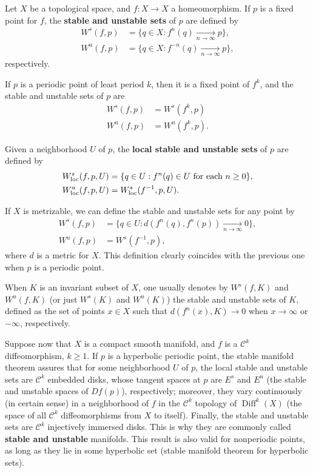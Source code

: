 \documentclass[12pt]{article}
\newcommand{\Diff}{\operatorname{Diff}}
\newcommand{\Cdiff}{\mathcal{C}}
\renewcommand{\emph}{\textbf}
\begin{document}

 Let $X$ be a topological space, and $f\colon X\rightarrow X$ a
homeomorphism. If $p$ is a fixed point for $f$, the \emph{stable and
unstable sets} of $p$ are defined by 
\begin{align*}
W^s(f,p)&=\{q\in X: f^n(q)\xrightarrow[n\rightarrow\infty]{} p\},\\ 
W^u(f,p)&=\{q\in X: f^{-n}(q)\xrightarrow[n\rightarrow\infty]{} p\}, 
\end{align*}
respectively.

If $p$ is a periodic point of least period $k$, then it is a fixed point of $f^k$, and the stable and unstable sets of $p$ are 
\begin{align*}
W^s(f,p)&= W^s(f^k,p)\\
W^u(f,p)&=W^u(f^k,p).
\end{align*}

Given a neighborhood $U$ of $p$, the \emph{local stable and unstable sets} of $p$ are defined by
\begin{align*}
W^s_{\text{loc}}(f,p,U)&= \{q\in U: f^n(q)\in U \textnormal{ for each }
n\geq 0\},\\ 
W^u_{\text{loc}}(f,p,U)&= W^s_{\text{loc}}(f^{-1},p,U).
\end{align*}

If $X$ is metrizable, we can define the stable and unstable sets for any point by
\begin{align*}
W^s(f,p) &= \{q\in U: d(f^n(q),f^n(p))\xrightarrow[n\rightarrow\infty]{} 0\},\\
W^u(f,p) &= W^s(f^{-1},p),
\end{align*} 
where $d$ is a metric for $X$. This definition clearly
coincides with the previous one when $p$ is a periodic point.

When $K$ is an invariant subset of $X$, one usually denotes by $W^s(f,K)$ and $W^u(f,K)$ (or just $W^s(K)$ and $W^u(K)$) the stable and unstable sets of $K$, defined as the set of points $x\in X$ such that $d(f^n(x),K)\to 0$ when $x\to \infty$ or $-\infty$, respectively.

Suppose now that $X$ is a compact smooth manifold, and $f$ is a $\Cdiff^k$
diffeomorphism, $k\geq 1$. If $p$ is a hyperbolic periodic point, the stable manifold theorem assures that for some neighborhood $U$ of $p$, the local stable and unstable sets are $\Cdiff^k$ embedded disks, whose tangent spaces at $p$ are $E^s$ and $E^u$ (the stable and unstable spaces of $Df(p)$), respectively; moreover, they vary continuously (in certain sense) in a neighborhood of $f$ in the $\Cdiff^k$ topology of $\Diff^k(X)$ (the space of all $\Cdiff^k$ diffeomorphisms from $X$ to itself). Finally, the stable and unstable sets are $\Cdiff^k$ injectively immersed disks.  This is why they are commonly called \emph{stable and unstable} manifolds. This result is also valid for nonperiodic points, as long as they lie in some hyperbolic set (stable manifold theorem for hyperbolic sets).
\end{document}
